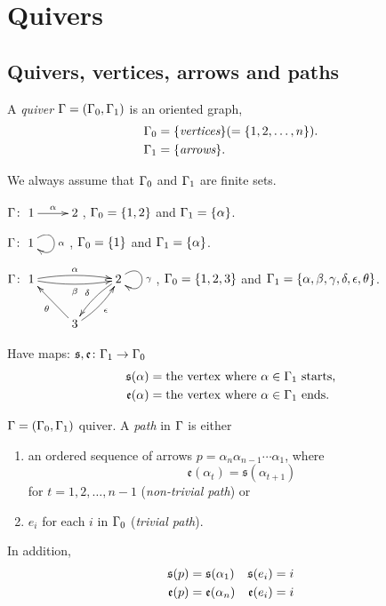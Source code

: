\section{Quivers}
\subsection{Quivers, vertices, arrows and paths}
\begin{defin}
A \emph{quiver} $\Gamma = (\Gamma_0,\Gamma_1)$ is an oriented graph,
\begin{align}
\G_0 & = \{\textit{vertices}\index{quiver!vertices}\}  (= \{1,2,\ldots,n\}).\notag\\
\G_1 & = \{\textit{arrows}\index{quiver!arrows}\}.\notag
\end{align}
\end{defin}
We always assume that $\Gamma_0$ and $\Gamma_1$ are finite sets.

\begin{exam}
$\G\colon \xymatrix{1\ar[r]^\alpha & 2}$, $\Gamma_0=\{1,2\}$ and $\Gamma_1=\{\alpha\}$. 
\end{exam}

\begin{exam}
$\G\colon \xymatrix{1\ar@(ur,dr)[]^\alpha}$, $\Gamma_0=\{1\}$ and $\Gamma_1=\{\alpha\}$. 
\end{exam}

\begin{exam} $\G\colon
  \xymatrix{1\ar@/^.3pc/[rr]^\alpha\ar@/_.3pc/[rr]_\beta & & 2\ar@(ur,dr)[]^\gamma\ar@/_0.3pc/[dl]_\delta\\
    & 3\ar[ul]^\theta\ar@/_0.3pc/[ur]_\epsilon & }$, $\Gamma_0=\{1,2,3\}$ and $\Gamma_1=\{\alpha,\beta,\gamma,\delta,\epsilon, \theta\}$.  
\end{exam}
Have maps: $\mathfrak{s}, \mathfrak{e}\colon \Gamma_1\to \Gamma_0$
\begin{align}
\mathfrak{s}(\alpha) & = \text{the vertex where $\alpha\in\G_1$ starts,}\notag\index{$\mathfrak{s}$}\\
\mathfrak{e}(\alpha) & = \text{the vertex where $\alpha\in\G_1$ ends.}\notag\index{$\mathfrak{e}$}
\end{align}

\begin{defin}
$\Gamma=(\Gamma_0,\Gamma_1)$ quiver.  A \emph{path} in $\Gamma$ is either
\begin{enumerate}[\rm(i)]
\item an ordered sequence of arrows $p=\alpha_n\alpha_{n-1}\cdots\alpha_1$, where 
\[\mathfrak{e}(\alpha_t) = \mathfrak{s}(\alpha_{t+1})\]
for $t = 1,2,\ldots,n-1$ (\emph{non-trivial path}) or
\item $e_i$ for each $i$ in $\Gamma_0$ (\emph{trivial path}).
\end{enumerate}
In addition,
\begin{align}
\mathfrak{s}(p) & = \mathfrak{s}(\alpha_1)  & \mathfrak{s}(e_i) = i\notag\\
\mathfrak{e}(p) & = \mathfrak{e}(\alpha_n)  & \mathfrak{e}(e_i) = i\notag
\end{align}
\end{defin}

